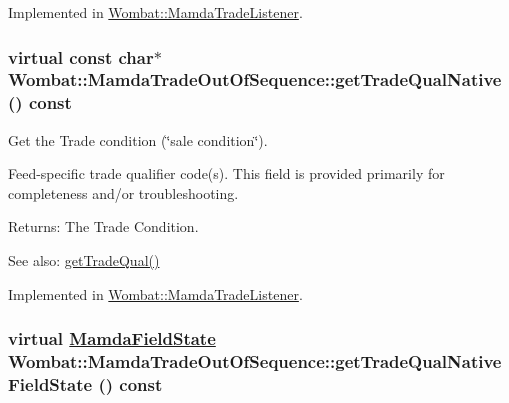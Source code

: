 Implemented in \hyperlink{classWombat_1_1MamdaTradeListener_958ea55776c3afa0a572b8819d9c04c8}{Wombat::Mamda\-Trade\-Listener}.\hypertarget{classWombat_1_1MamdaTradeOutOfSequence_3364a708c76898275745e1f542d76bc7}{
\subsubsection[getTradeQualNative]{\setlength{\rightskip}{0pt plus 5cm}virtual const char$\ast$ Wombat::Mamda\-Trade\-Out\-Of\-Sequence::get\-Trade\-Qual\-Native () const}}
\label{classWombat_1_1MamdaTradeOutOfSequence_3364a708c76898275745e1f542d76bc7}


Get the Trade condition (\char`\"{}sale condition\char`\"{}). 

Feed-specific trade qualifier code(s). This field is provided primarily for completeness and/or troubleshooting.

\begin{Desc}
\item[Returns:]The Trade Condition. \end{Desc}
\begin{Desc}
\item[See also:]\hyperlink{classWombat_1_1MamdaTradeOutOfSequence_b1fd563edcdc54c1fbce4c95281bd9b2}{get\-Trade\-Qual()} \end{Desc}


Implemented in \hyperlink{classWombat_1_1MamdaTradeListener_7b01373c290fe46a0a1e00a861996a06}{Wombat::Mamda\-Trade\-Listener}.\hypertarget{classWombat_1_1MamdaTradeOutOfSequence_14b366022a0e2dd71b09b6d4693f44da}{
\subsubsection[getTradeQualNativeFieldState]{\setlength{\rightskip}{0pt plus 5cm}virtual \hyperlink{namespaceWombat_93aac974f2ab713554fd12a1fa3b7d2a}{Mamda\-Field\-State} Wombat::Mamda\-Trade\-Out\-Of\-Sequence::get\-Trade\-Qual\-Native\-Field\-State () const}}
\label{classWombat_1_1MamdaTradeOutOfSequence_14b366022a0e2dd71b09b6d4693f44da}


